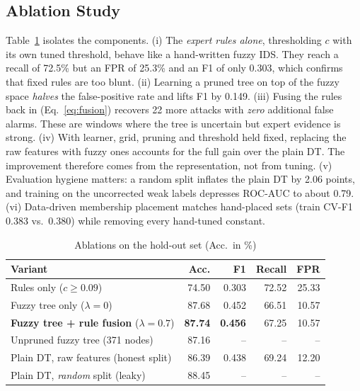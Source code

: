\documentclass[conference]{IEEEtran}
\begin{document}
\subsection{Ablation Study}
\label{sec:ablation}
Table~\ref{tab:ablation} isolates the components. (i) The \emph{expert rules alone}, thresholding $c$ with its own tuned threshold, behave like a hand-written fuzzy IDS. They reach a recall of 72.5\% but an FPR of 25.3\% and an F1 of only 0.303, which confirms that fixed rules are too blunt. (ii) Learning a pruned tree on top of the fuzzy space \emph{halves} the false-positive rate and lifts F1 by 0.149. (iii) Fusing the rules back in (Eq.~\eqref{eq:fusion}) recovers 22 more attacks with \emph{zero} additional false alarms. These are windows where the tree is uncertain but expert evidence is strong. (iv) With learner, grid, pruning and threshold held fixed, replacing the raw features with fuzzy ones accounts for the full gain over the plain DT. The improvement therefore comes from the representation, not from tuning. (v) Evaluation hygiene matters: a random split inflates the plain DT by 2.06 points, and training on the uncorrected weak labels depresses ROC-AUC to about 0.79. (vi) Data-driven membership placement matches hand-placed sets (train CV-F1 0.383 vs.\ 0.380) while removing every hand-tuned constant.

\begin{table}[t]
\centering
\caption{Ablations on the hold-out set (Acc.\ in \%)}
\label{tab:ablation}
\footnotesize
\renewcommand{\arraystretch}{1.08}
\setlength{\tabcolsep}{3.5pt}
\begin{tabular}{@{}l r r r r@{}}
\toprule
\textbf{Variant} & \textbf{Acc.} & \textbf{F1} & \textbf{Recall} & \textbf{FPR} \\
\midrule
Rules only ($c\ge0.09$) & 74.50 & 0.303 & 72.52 & 25.33 \\
Fuzzy tree only ($\lambda=0$) & 87.68 & 0.452 & 66.51 & 10.57 \\
\textbf{Fuzzy tree + rule fusion} ($\lambda=0.7$) & \textbf{87.74} & \textbf{0.456} & 67.25 & 10.57 \\
Unpruned fuzzy tree (371 nodes) & 87.16 & -- & -- & -- \\
Plain DT, raw features (honest split) & 86.39 & 0.438 & 69.24 & 12.20 \\
Plain DT, \emph{random} split (leaky) & 88.45 & -- & -- & -- \\
\bottomrule
\end{tabular}
\end{table}
\end{document}
